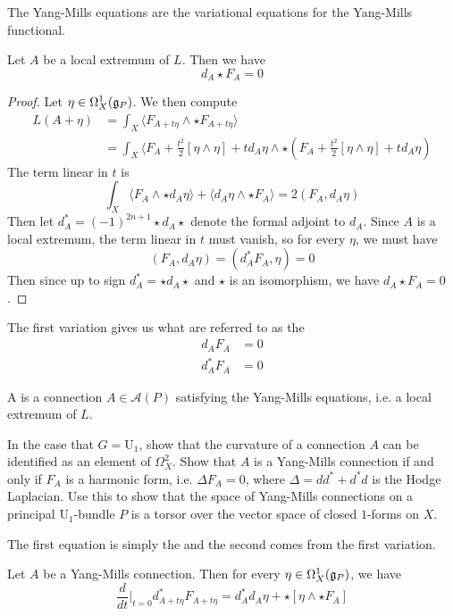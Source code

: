 The Yang-Mills equations are the variational equations for the Yang-Mills
functional.
%
\begin{prop}
Let $A$ be a local extremum of $L$. Then we have
\[
d_A\star F_A = 0
\]
\end{prop}
%
\begin{proof}
Let $\eta \in \Omega^1_X(\mathfrak{g}_P)$. We then compute
\begin{align*}
L(A+\eta) &= \int_X \langle F_{A+t\eta}\wedge\star F_{A+t\eta}\rangle \\
&= \int_X\langle F_A + \frac{t^2}{2}[\eta\wedge\eta] + td_A\eta\wedge
\star(F_A + \frac{t^2}{2}[\eta\wedge\eta] + td_A\eta)
\end{align*}
The term linear in $t$ is
\[
\int_X \langle F_A\wedge\star d_A\eta\rangle + \langle d_A\eta\wedge\star F_A\rangle =
2(F_A,d_A\eta)
\]
Then let $d^*_A = (-1)^{2n+1}\star d_A\star$ denote the formal adjoint to
$d_A$. Since $A$ is a local extremum, the term linear in $t$ must vanish,
so for every $\eta$, we must have
\[
(F_A,d_A\eta) = (d^*_AF_A,\eta) = 0
\]
Then since up to sign $d^*_A = \star d_A \star$ and $\star$ is an isomorphism,
we have $d_A\star F_A = 0$.
\end{proof}
%
The first variation gives us what are referred to as the 
\begin{align*}
d_A F_A &= 0 \\
d_A^*F_A &= 0
\end{align*}
%
\begin{defn}
A  is a connection $A \in \mathscr{A}(P)$ satisfying
the Yang-Mills equations, i.e. a local extremum of $L$.
\end{defn}
%
\begin{exer}
In the case that $G = \mathrm{U}_1$, show that the curvature of a connection
$A$ can be identified as an element of $\Omega^2_X$. Show that $A$ is a
Yang-Mills connection if and only if $F_A$ is a harmonic form, i.e.
$\Delta F_A = 0$, where $\Delta = dd^* + d^*d$ is the Hodge Laplacian.
Use this to show that the space of Yang-Mills connections on a principal
$\mathrm{U}_1$-bundle $P$ is a torsor over the vector space of closed $1$-forms
on $X$.
\end{exer}
%
The first equation is simply the  and the second comes
from the first variation.
%
\begin{prop}
Let $A$ be a Yang-Mills connection. Then for every $\eta \in \Omega^1_X(\mathfrak{g}_P)$, we have
\[
\frac{d}{dt}\bigg\vert_{t=0}d^*_{A+t\eta}F_{A+t\eta} =
d^*_Ad_A\eta + \star[\eta\wedge\star F_A]
\]
\end{prop}
